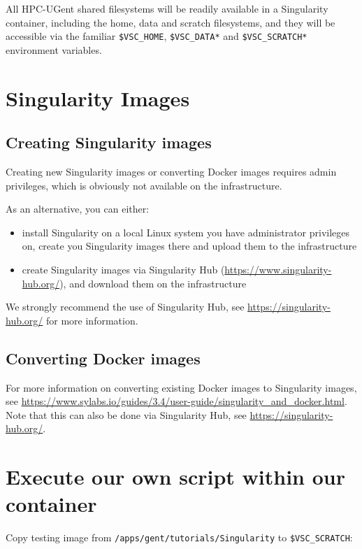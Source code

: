 All HPC-UGent shared filesystems will be readily available in a Singularity container,
including the home, data and scratch filesystems, and they will be accessible via the
familiar \lstinline|$VSC_HOME|, \lstinline|$VSC_DATA*| and \lstinline|$VSC_SCRATCH*| environment variables.

\section{Singularity Images}

\subsection{Creating Singularity images}

Creating new Singularity images or converting Docker images requires admin privileges,
which is obviously not available on the \hpcInfra infrastructure.

As an alternative, you can either:

\begin{itemize}
    \item install Singularity on a local Linux system you have administrator privileges on,
        create you Singularity images there and upload them to the \hpcInfra infrastructure
    \item create Singularity images via Singularity Hub (\url{https://www.singularity-hub.org/}),
        and download them on the \hpcInfra infrastructure
\end{itemize}

We strongly recommend the use of Singularity Hub, see \url{https://singularity-hub.org/} for more information.

\subsection{Converting Docker images}

For more information on converting existing Docker images to Singularity images,
see \url{https://www.sylabs.io/guides/3.4/user-guide/singularity_and_docker.html}.
Note that this can also be done via Singularity Hub, see \url{https://singularity-hub.org/}.

\section{Execute our own script within our container}

Copy testing image from \lstinline|/apps/gent/tutorials/Singularity| to \lstinline|$VSC_SCRATCH|:

